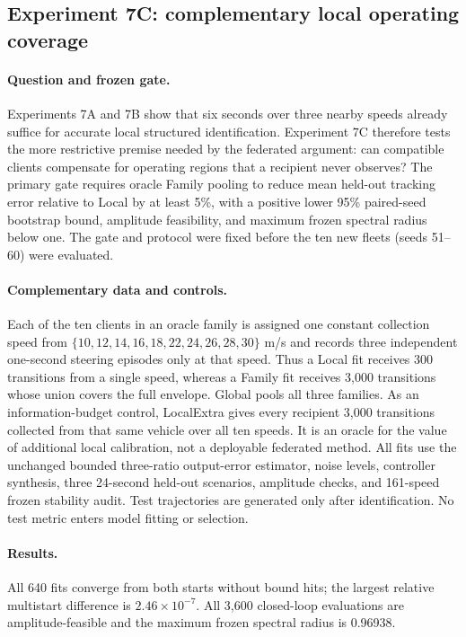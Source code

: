 \subsection{Experiment 7C: complementary local operating coverage}
\label{sec:experiment7c}

\paragraph{Question and frozen gate.}
Experiments 7A and 7B show that six seconds over three nearby speeds already
suffice for accurate local structured identification. Experiment 7C therefore
tests the more restrictive premise needed by the federated argument: can
compatible clients compensate for operating regions that a recipient never
observes? The primary gate requires oracle Family pooling to reduce mean
held-out tracking error relative to Local by at least 5\%, with a positive
lower 95\% paired-seed bootstrap bound, amplitude feasibility, and maximum
frozen spectral radius below one. The gate and protocol were fixed before the
ten new fleets (seeds 51--60) were evaluated.

\paragraph{Complementary data and controls.}
Each of the ten clients in an oracle family is assigned one constant collection
speed from $\{10,12,14,16,18,22,24,26,28,30\}$ m/s and records three independent
one-second steering episodes only at that speed. Thus a Local fit receives 300
transitions from a single speed, whereas a Family fit receives 3,000 transitions
whose union covers the full envelope. Global pools all three families. As an
information-budget control, LocalExtra gives every recipient 3,000 transitions
collected from that same vehicle over all ten speeds. It is an oracle for the
value of additional local calibration, not a deployable federated method.
All fits use the unchanged bounded three-ratio output-error estimator, noise
levels, controller synthesis, three 24-second held-out scenarios, amplitude
checks, and 161-speed frozen stability audit. Test trajectories are generated
only after identification. No test metric enters model fitting or selection.

\paragraph{Results.}
All 640 fits converge from both starts without bound hits; the largest relative
multistart difference is $2.46\times10^{-7}$. All 3,600 closed-loop evaluations
are amplitude-feasible and the maximum frozen spectral radius is 0.96938.

